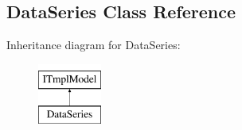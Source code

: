 \hypertarget{classHighcharts_1_1DataSeries}{}\subsection{Data\+Series Class Reference}
\label{classHighcharts_1_1DataSeries}
Inheritance diagram for Data\+Series\+:\begin{figure}[H]
\begin{center}
\leavevmode
\includegraphics[height=2.000000cm]{classHighcharts_1_1DataSeries}
\end{center}
\end{figure}
